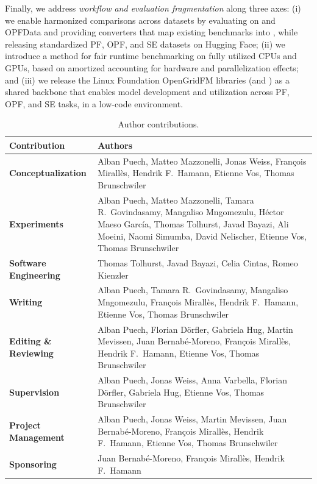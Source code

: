 Finally, we address \textit{workflow and evaluation fragmentation} along three axes: (i) we enable harmonized comparisons across datasets by evaluating \genco on \pfdelta and OPFData and providing converters that map existing benchmarks into \datakit, while releasing standardized PF, OPF, and SE datasets on Hugging Face; (ii) we introduce a method for fair runtime benchmarking on fully utilized CPUs and GPUs, based on amortized accounting for hardware and parallelization effects; and (iii) we release the Linux Foundation OpenGridFM libraries (\datakit and \graphkit) as a shared backbone that enables model development and utilization across PF, OPF, and SE tasks, in a low-code environment. %









\begin{table}
\centering
\small
\caption{Author contributions.}
\label{tab:contributions}
\begin{tabularx}{\linewidth}{>{\bfseries}l X}
\hline
Contribution & Authors \\
\hline
Conceptualization &
Alban Puech, Matteo Mazzonelli, Jonas Weiss, François Mirallès, Hendrik F.~Hamann, Etienne Vos, Thomas Brunschwiler \\
\hline
Experiments &
Alban Puech, Matteo Mazzonelli, Tamara R.~Govindasamy, Mangaliso Mngomezulu, Héctor Maeso García, Thomas Tolhurst, Javad Bayazi, Ali Moeini, Naomi Simumba, David Nelischer, Etienne Vos, Thomas Brunschwiler \\
\hline
Software Engineering &
Thomas Tolhurst, Javad Bayazi, Celia Cintas, Romeo Kienzler \\
\hline
Writing &
Alban Puech, Tamara R.~Govindasamy, Mangaliso Mngomezulu, François Mirallès, Hendrik F.~Hamann, Etienne Vos, Thomas Brunschwiler \\
\hline
Editing \& Reviewing &
Alban Puech, Florian Dörfler, Gabriela Hug, Martin Mevissen, Juan Bernabé-Moreno, François Mirallès, Hendrik F.~Hamann, Etienne Vos, Thomas Brunschwiler \\
\hline
Supervision &
Alban Puech, Jonas Weiss, Anna Varbella, Florian Dörfler, Gabriela Hug, Etienne Vos, Thomas Brunschwiler \\
\hline
Project Management &
Alban Puech, Jonas Weiss, Martin Mevissen, Juan Bernabé-Moreno, François Mirallès, Hendrik F.~Hamann, Etienne Vos, Thomas Brunschwiler \\
\hline
Sponsoring &
Juan Bernabé-Moreno, François Mirallès, Hendrik F.~Hamann \\
\hline
\end{tabularx}
\end{table}


